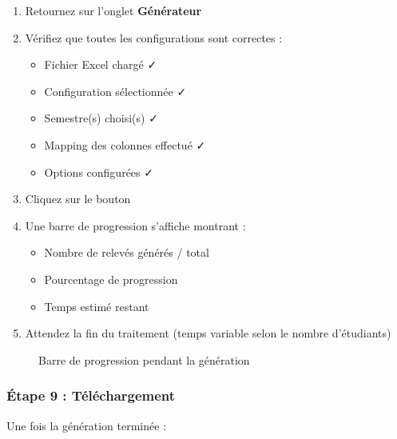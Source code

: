 \begin{enumerate}[leftmargin=*]
    \item Retournez sur l'onglet \textbf{Générateur}
    \item Vérifiez que toutes les configurations sont correctes :
    \begin{itemize}
        \item Fichier Excel chargé ✓
        \item Configuration sélectionnée ✓
        \item Semestre(s) choisi(s) ✓
        \item Mapping des colonnes effectué ✓
        \item Options configurées ✓
    \end{itemize}
    \item Cliquez sur le bouton 
    \item Une barre de progression s'affiche montrant :
    \begin{itemize}
        \item Nombre de relevés générés / total
        \item Pourcentage de progression
        \item Temps estimé restant
    \end{itemize}
    \item Attendez la fin du traitement (temps variable selon le nombre d'étudiants)
\end{enumerate}

\begin{figure}[h]
    \centering
    \caption{Barre de progression pendant la génération}
\end{figure}

\subsubsection{Étape 9 : Téléchargement}

Une fois la génération terminée :

